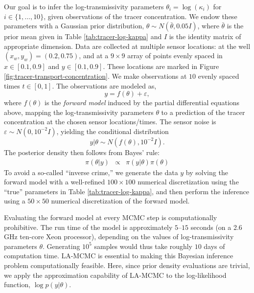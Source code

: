 Our goal is to infer the log-transmissivity parameters $\theta_i = \log{(\kappa_i)}$ for $i \in \{1,\ldots,10\}$, given observations of the tracer concentration. We endow these parameters with a Gaussian prior distribution, $\theta \sim N(\bar{\theta}, 0.05 {I})$, where $\bar{\theta}$ is the prior mean given in Table \ref{tab:tracer-log-kappa} and ${I}$ is the identity matrix of appropriate dimension. Data are collected at multiple sensor locations: at the well $(x_w, y_w) = (0.2, 0.75)$, and at a $9 \times 9$ array of points evenly spaced in $x \in [0.1, 0.9]$ and $y \in [0.1, 0.9]$. These locations are marked in Figure \ref{fig:tracer-transport-concentration}. We make observations at $10$ evenly spaced times $t \in [0, 1]$. The observations are modeled as,
\begin{equation}
    y = f(\theta) + \varepsilon,
\end{equation}
where $f(\theta)$ is the \textit{forward model} induced by the partial differential equations above, mapping the log-transmissivity parameters $\theta$ to a prediction of the tracer concentration at the chosen sensor locations/times. The sensor noise is $\varepsilon \sim N(0, 10^{-2} {I})$, yielding the conditional distribution 
\begin{equation}
y \vert \theta \sim  N(f(\theta), 10^{-2} I).
\end{equation}
The posterior density then follows from Bayes' rule:
\begin{eqnarray}
    \pi(\theta \vert y) &\propto& \pi(y \vert \theta) \pi(\theta)
    \label{eq:tracer-posterior}
\end{eqnarray}
To avoid a so-called ``inverse crime,''  we generate the data $y$ by solving the forward model with a well-refined $100 \times 100$ numerical discretization using the ``true'' parameters in Table \ref{tab:tracer-log-kappa}, and then perform the inference using a $50 \times 50$ numerical discretization of the forward model.

Evaluating the forward model at every MCMC step is computationally prohibitive. The run time of the model is approximately $5$--$15$ seconds (on a 2.6 GHz ten-core Xeon processor), depending on the values of log-transmissivity parameters $\theta$. Generating $10^5$ samples would thus take roughly $10$ days of computation time. LA-MCMC is essential to making this Bayesian inference problem computationally feasible. Here, since prior density evaluations are trivial, we apply the approximation capability of LA-MCMC to the log-likelihood function, $\log p(y \vert \theta)$. 

